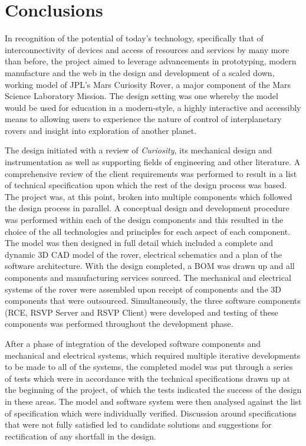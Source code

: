 \chapter{Conclusions}
\label{chap:conclusions}
  In recognition of the potential of today's technology, specifically that of interconnectivity of devices and access of resources and services by many more than before, the project aimed to leverage advancements in prototyping, modern manufacture and the web in the design and development of a scaled down, working model of JPL's Mars Curiosity Rover, a major component of the Mars Science Laboratory Mission. The design setting was one whereby the model would be used for education in a modern-style, a highly interactive and accessibly means to allowing users to experience the nature of control of interplanetary rovers and insight into exploration of another planet.
  
  The design initiated with a review of \textit{Curiosity}, its mechanical design and instrumentation as well as supporting fields of engineering and other literature. A comprehensive review of the client requirements was performed to result in a list of technical specification upon which the rest of the design process was based. The project was, at this point, broken into multiple components which followed the design process in parallel. A conceptual design and development procedure was performed within each of the design components and this resulted in the choice of the all technologies and principles for each aspect of each component. The model was then designed in full detail which included a complete and dynamic 3D CAD model of the rover, electrical schematics and a plan of the software architecture. With the design completed, a BOM was drawn up and all components and manufacturing services sourced. The mechanical and electrical systems of the rover were assembled upon receipt of components and the 3D components that were outsourced. Simultaneously, the three software components (RCE, RSVP Server and RSVP Client) were developed and testing of these components was performed throughout the development phase.
  
  After a phase of integration of the developed software components and mechanical and electrical systems, which required multiple iterative developments to be made to all of the systems, the completed model was put through a series of tests which were in accordance with the technical specifications drawn up at the beginning of the project, of which the tests indicated the success of the design in these areas. The model and software system were then analysed against the list of specification which were individually verified. Discussion around specifications that were not fully satisfied led to candidate solutions and suggestions for rectification of any shortfall in the design.
  
